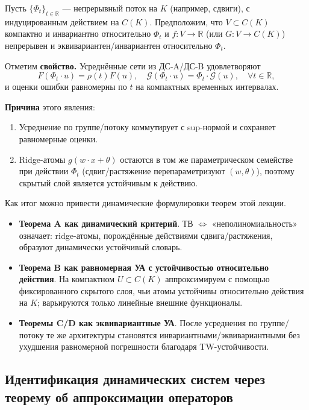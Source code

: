 \documentclass[../NDCNNAI_main.tex]{subfiles}
\begin{document}
Пусть \( \{\Phi_t\}_{t \in \mathbb{R}} \) --- непрерывный поток на \( K \) (например, сдвиги), с индуцированным действием на \( C(K) \). Предположим, что \( V \subset C(K) \) компактно и инвариантно относительно \( \Phi_t \) и \( f \colon V \to \mathbb{R} \) (или \( G \colon V \to C(K) \)) непрерывен и эквивариантен/инвариантен относительно \( \Phi_t \).

Отметим \textbf{свойство.} Усреднённые сети из ДС-A/ДС-B удовлетворяют  
\[
F(\Phi_t \cdot u) = \rho(t) F(u), \quad \mathcal{G}(\Phi_t \cdot u) = \Phi_t \cdot \mathcal{G}(u), \quad \forall t \in \mathbb{R},
\]
и оценки ошибки равномерны по \( t \) на компактных временных интервалах.

\textbf{Причина} этого явления:
\begin{enumerate}[label=(\roman*)]
    \item Усреднение по группе/потоку коммутирует с sup-нормой и сохраняет равномерные оценки.
    \item Ridge-атомы \( g(w \cdot x + \theta) \) остаются в том же параметрическом семействе при действии \( \Phi_t \) (сдвиг/растяжение перепараметризуют \( (w, \theta) \)), поэтому скрытый слой является устойчивым к действию.
\end{enumerate}

Как итог можно привести динамические формулировки теорем этой лекции.
\begin{itemize}
\item \textbf{Теорема A как динамический критерий}. ТВ \( \Leftrightarrow \) «неполиномиальность» означает: ridge-атомы, порождённые действиями сдвига/растяжения, образуют динамически устойчивый словарь.

\item \textbf{Теорема B как равномерная УА с устойчивостью относительно действия}. На компактном \( U \subset C(K) \) аппроксимируем с помощью фиксированного скрытого слоя, чьи атомы устойчивы относительно действия на \( K \); варьируются только линейные внешние функционалы.

\item \textbf{Теоремы C/D как эквивариантные УА}. После усреднения по группе/потоку те же архитектуры становятся инвариантными/эквивариантными без ухудшения равномерной погрешности благодаря TW-устойчивости.
\end{itemize}



\subsection{Идентификация динамических систем через теорему об аппроксимации операторов}
\end{document}

